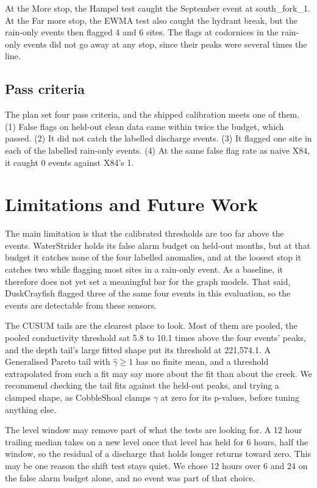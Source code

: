 \documentclass{article}
\begin{document}
At the More stop, the Hampel test caught the September event at
south\_fork\_1. At the Far more stop, the EWMA test also caught the hydrant
break, but the rain-only events then flagged 4 and 6 sites. The flags at
codornices in the rain-only events did not go away at any stop, since their
peaks were several times the line.

\subsection{Pass criteria}
\label{sec:criteria}

The plan set four pass criteria, and the shipped calibration meets one of
them. (1) False flags on held-out clean data came within twice the budget,
which passed. (2) It did not catch the labelled discharge events. (3) It
flagged one site in each of the labelled rain-only events. (4) At the same
false flag rate as naive X84, it caught 0 events against X84's 1.

\section{Limitations and Future Work}
\label{sec:limitations}

The main limitation is that the calibrated thresholds are too far above the
events. WaterStrider holds its false alarm budget on held-out months, but at
that budget it catches none of the four labelled anomalies, and at the loosest
stop it catches two while flagging most sites in a rain-only event. As a
baseline, it therefore does not yet set a meaningful bar for the graph models.
That said, DuskCrayfish flagged three of the same four events in this
evaluation, so the events are detectable from these sensors.

The CUSUM tails are the clearest place to look. Most of them are pooled, the
pooled conductivity threshold sat 5.8 to 10.1 times above the four events'
peaks, and the depth tail's large fitted shape put its threshold at
221{,}574.1. A Generalised Pareto tail with $\hat{\gamma} \ge 1$ has no finite
mean, and a threshold extrapolated from such a fit may say more about the fit
than about the creek. We recommend checking the tail fits against the held-out
peaks, and trying a clamped shape, as CobbleShoal clamps $\gamma$ at zero for
its p-values, before tuning anything else.

The level window may remove part of what the tests are looking for. A 12
hour trailing median takes on a new level once that level has held for 6
hours, half the window, so the residual of a discharge that holds longer
returns toward zero. This may be one reason the shift test stays quiet. We
chose 12 hours over 6 and 24 on the false alarm budget alone, and no event was
part of that choice.
\end{document}
